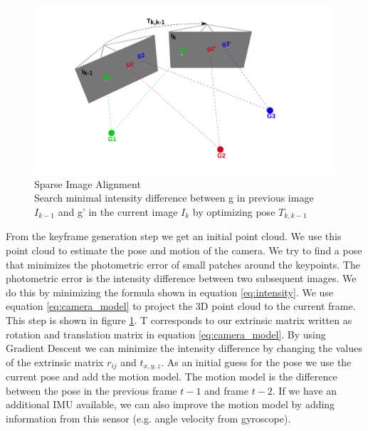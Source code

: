 \documentclass[11pt,a4paper,titlepage,oneside]{report}
\begin{document}
\begin{figure}[H]
  \centering
  \includegraphics[width=0.99\textwidth]{img/pose_estimation_sparse.png}
  \caption{Sparse Image Alignment\\
  Search minimal intensity difference between g in previous image $I_{k-1}$ and g' in the current image $I_k$ by optimizing pose $T_{k,k-1}$}
  \label{fig:sparse_image_alignment}
\end{figure}


From the keyframe generation step we get an initial point cloud. We use this point cloud to estimate the pose and motion of the camera. We try to find a pose that minimizes the photometric error of small patches around the keypoints. The photometric error is the intensity difference between two subsequent images. We do this by minimizing the formula shown in equation \ref{eq:intensity}. We use equation \ref{eq:camera_model} to project the 3D point cloud to the current frame. This step is shown in figure \ref{fig:sparse_image_alignment}. T corresponds to our extrinsic matrix written as rotation and translation matrix in equation \ref{eq:camera_model}. By using Gradient Descent we can minimize the intensity difference by changing the values of the extrinsic matrix $r_{ij}$ and $t_{x,y,z}$. As an initial guess for the pose we use the current pose and add the motion model. The motion model is the difference between the pose in the previous frame $t-1$ and frame $t-2$. If we have an additional IMU available, we can also improve the motion model by adding information from this sensor (e.g. angle velocity from gyroscope).
\end{document}
